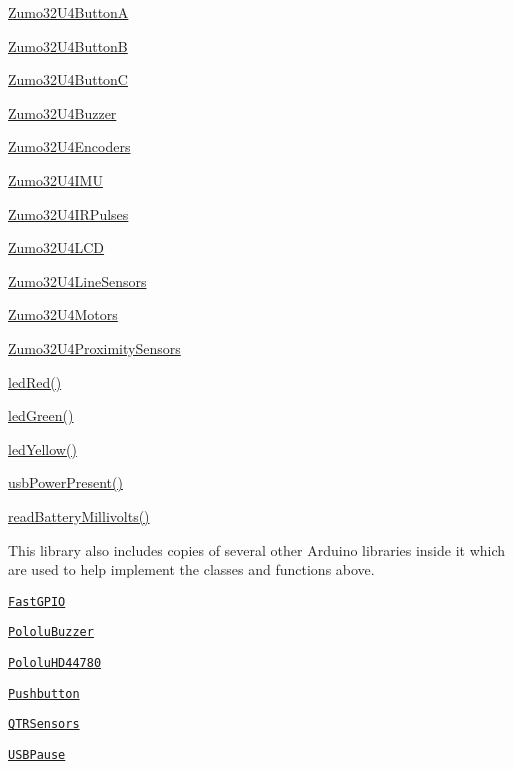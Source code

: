 \begin{DoxyItemize}
\item \hyperlink{class_zumo32_u4_button_a}{Zumo32\+U4\+ButtonA}
\item \hyperlink{class_zumo32_u4_button_b}{Zumo32\+U4\+ButtonB}
\item \hyperlink{class_zumo32_u4_button_c}{Zumo32\+U4\+ButtonC}
\item \hyperlink{class_zumo32_u4_buzzer}{Zumo32\+U4\+Buzzer}
\item \hyperlink{class_zumo32_u4_encoders}{Zumo32\+U4\+Encoders}
\item \hyperlink{class_zumo32_u4_i_m_u}{Zumo32\+U4\+I\+MU}
\item \hyperlink{class_zumo32_u4_i_r_pulses}{Zumo32\+U4\+I\+R\+Pulses}
\item \hyperlink{class_zumo32_u4_l_c_d}{Zumo32\+U4\+L\+CD}
\item \hyperlink{class_zumo32_u4_line_sensors}{Zumo32\+U4\+Line\+Sensors}
\item \hyperlink{class_zumo32_u4_motors}{Zumo32\+U4\+Motors}
\item \hyperlink{class_zumo32_u4_proximity_sensors}{Zumo32\+U4\+Proximity\+Sensors}
\item \hyperlink{_zumo32_u4_8h_ae6ec5117b26ffaaa1b81c8c8b34426e1}{led\+Red()}
\item \hyperlink{_zumo32_u4_8h_a22e68694b618fe149ed42d76e96597ca}{led\+Green()}
\item \hyperlink{_zumo32_u4_8h_a7528cb14b314ccde63c94049402d01c6}{led\+Yellow()}
\item \hyperlink{_zumo32_u4_8h_acf21c49681fe010784b631551ab921f3}{usb\+Power\+Present()}
\item \hyperlink{_zumo32_u4_8h_a9391e187045f8f5a48546b34b6c6db25}{read\+Battery\+Millivolts()}
\end{DoxyItemize}

This library also includes copies of several other Arduino libraries inside it which are used to help implement the classes and functions above.


\begin{DoxyItemize}
\item \href{https://github.com/pololu/fastgpio-arduino}{\tt Fast\+G\+P\+IO}
\item \href{https://github.com/pololu/pololu-buzzer-arduino}{\tt Pololu\+Buzzer}
\item \href{https://github.com/pololu/pololu-hd44780-arduino}{\tt Pololu\+H\+D44780}
\item \href{https://github.com/pololu/pushbutton-arduino}{\tt Pushbutton}
\item \href{https://github.com/pololu/qtr-sensors-arduino}{\tt Q\+T\+R\+Sensors}
\item \href{https://github.com/pololu/usb-pause-arduino}{\tt U\+S\+B\+Pause}
\end{DoxyItemize}

